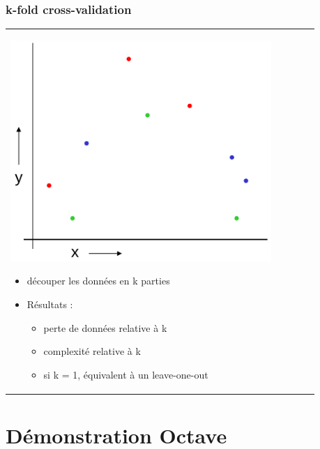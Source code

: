 \documentclass[handout]{beamer}
\begin{document}
		\begin{frame}
		\frametitle{k-fold cross-validation}
		\begin{tabular}{l l}
			\begin{minipage}{0.5\textwidth}
				\begin{center}
					\includegraphics[width=0.9\textwidth]{images/k-fold.png}
				\end{center}
			\end{minipage}

			\begin{minipage}{0.5\textwidth}
				\begin{itemize}
					\item découper les données en k parties
					\item Résultats :
					\begin{itemize}
						\item perte de données relative à k
						\item complexité relative à k
						\item si k = 1, équivalent à un leave-one-out
					\end{itemize}
				\end{itemize}
			\end{minipage}

		\end{tabular}
		\end{frame}

	\section{Démonstration Octave}
\end{document}
